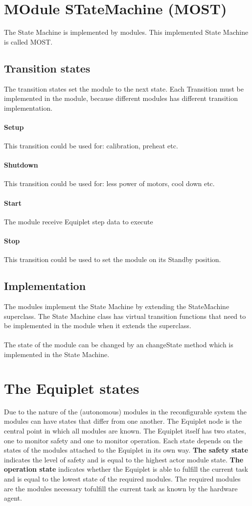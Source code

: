 \newpage
\section{MOdule STateMachine (MOST)}
The State Machine is implemented by modules. This implemented State Machine is called MOST.

\subsection{Transition states}
The transition states set the module to the next state. Each Transition must be implemented in the module, because different modules has different transition implementation.

\paragraph{Setup}This transition could be used for: calibration, preheat etc.
\paragraph{Shutdown}This transition could be used for: less power of motors, cool down etc.
\paragraph{Start}The module receive Equiplet step data to execute
\paragraph{Stop}This transition could be used to set the module on its Standby position.

\subsection{Implementation}
The modules implement the State Machine by extending the StateMachine superclass. The State Machine class has virtual transition functions that need to be implemented in the module when it extends the superclass.
\\\\
The state of the module can be changed by an changeState method which is implemented in the State Machine.

\section{The Equiplet states}
Due to the nature of the (autonomous) modules in the reconfigurable system the modules can have states that differ from one another. The Equiplet node is the central point in which all modules are known. The Equiplet itself has two states, one to monitor safety and one to monitor operation. Each state depends on the states of the modules attached to the Equiplet in its own
way.
\textbf{The safety state} indicates the level of safety and is equal to the highest actor module state.
\textbf{The operation state} indicates whether the Equiplet is able to fulfill the current task and is equal to the lowest state of the required modules. The required modules are the modules necessary tofulfill the current task as known by the hardware agent.\cite{mast_funcional_design}

